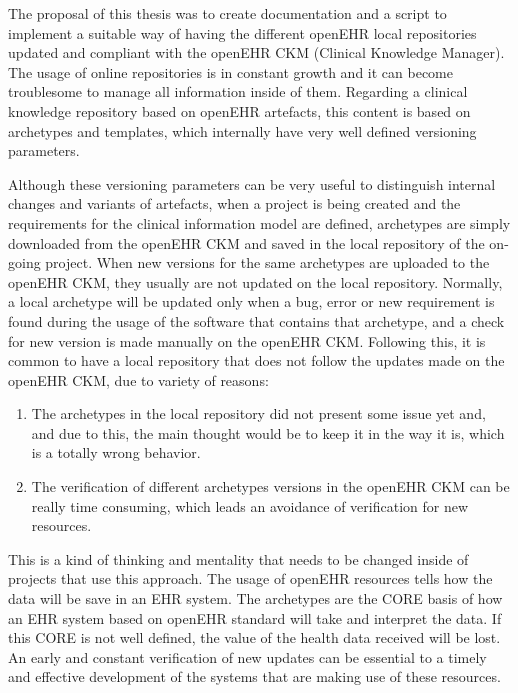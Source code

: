 \documentclass[mim_thesis.tex]{subfiles}
\begin{document}
The proposal of this thesis was to create documentation and a script to implement a suitable way of having the different openEHR local repositories updated and compliant with the openEHR CKM (Clinical Knowledge Manager).\\   

The usage of online repositories is in constant growth and it can become troublesome to manage all information inside of them. Regarding a clinical knowledge repository based on openEHR artefacts, this content is based on archetypes and templates, which internally have very well defined versioning parameters.

Although these versioning parameters can be very useful to distinguish internal changes and variants of artefacts, when a project is being created and the requirements for the clinical information model are defined, archetypes are simply downloaded from the openEHR CKM and saved in the local repository of the on-going project. When new versions for the same archetypes are uploaded to the openEHR CKM, they usually are not updated on the local repository. Normally, a local archetype will be updated only when a bug, error or new requirement is found during the usage of the software that contains that archetype, and a check for new version is made manually on the openEHR CKM. Following this, it is common to have a local repository that does not follow the updates made on the openEHR CKM, due to variety of reasons: 

\begin{enumerate}[noitemsep]
\item The archetypes in the local repository did not present some issue yet and, and due to this, the main thought would be to keep it in the way it is, which is a totally wrong behavior. 
\item The verification of different archetypes versions in the openEHR CKM can be really time consuming, which leads an avoidance of verification for new resources.
\end{enumerate}

This is a kind of thinking and mentality that needs to be changed inside of projects that use this approach. The usage of openEHR resources tells how the data will be save in an EHR system. The archetypes are the CORE basis of how an EHR system based on openEHR standard will take and interpret the data. If this CORE is not well defined, the value of the health data received will be lost. An early and constant verification of new updates can be essential to a timely and effective development of the systems that are making use of these resources.
\end{document}

